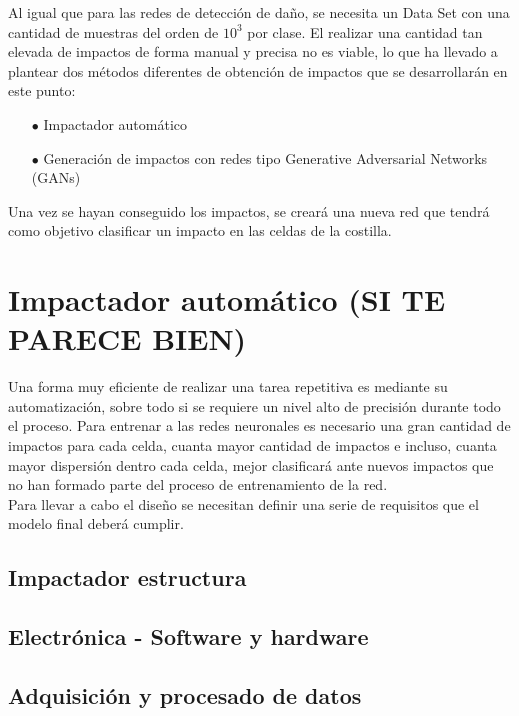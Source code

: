 Al igual que para las redes de detección de daño, se necesita un Data Set con una cantidad de muestras del orden de $10^3$ por clase. El realizar una cantidad tan elevada de impactos de forma manual y precisa no es viable, lo que ha llevado a plantear dos métodos diferentes de obtención de impactos que se desarrollarán en este punto:

\begin{itemize}
    \item[$\bullet$] Impactador automático
    \item[$\bullet$] Generación de impactos con redes tipo Generative Adversarial Networks (GANs)
\end{itemize}

Una vez se hayan conseguido los impactos, se creará una nueva red que tendrá como objetivo clasificar un impacto en las celdas de la costilla.


\section{Impactador automático (SI TE PARECE BIEN)}

Una forma muy eficiente de realizar una tarea repetitiva es mediante su automatización, sobre todo si se requiere un nivel alto de precisión durante todo el proceso. Para entrenar a las redes neuronales es necesario una gran cantidad de impactos para cada celda, cuanta mayor cantidad de impactos e incluso, cuanta mayor dispersión dentro cada celda, mejor clasificará ante nuevos impactos que no han formado parte del proceso de entrenamiento de la red.\\

Para llevar a cabo el diseño se necesitan definir una serie de requisitos que el modelo final deberá cumplir. 

    \subsection{Impactador estructura}


    \subsection{Electrónica - Software y hardware}


    \subsection{Adquisición y procesado de datos}

